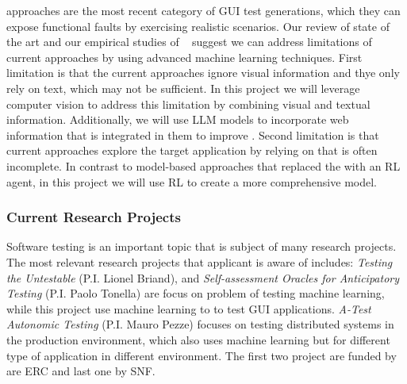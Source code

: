 
\smallskip 
\testreuse approaches are the most recent category of GUI test generations, which they can expose functional faults by exercising realistic scenarios.
Our review of state of the art and our empirical studies of \testreuse~\cite{mariani:SemFinder:ISSTA:2021,khalili:DomainEmbedding:ICPC:2022} suggest  we can address limitations of current approaches by using advanced machine learning techniques.
First limitation is that the current \testreuse approaches ignore visual information and thye only rely on text, which may not be sufficient. 
In this project we will leverage computer vision to address this limitation by combining visual and textual information.
Additionally, we will use LLM models to incorporate web information that is integrated in them to improve \testreuse. 
Second limitation is that current approaches explore the target application by relying on \tam that is often incomplete.
In contrast to model-based approaches that replaced the \tam with an RL agent, in this project we will use RL to create a more comprehensive model.


\subsubsection{Current Research Projects}

Software testing is an important topic that is subject of many research projects.
The most relevant research projects that applicant is aware of includes:
\textit{Testing the Untestable} (P.I. Lionel Briand), and
\textit{Self-assessment Oracles for Anticipatory Testing} (P.I. Paolo Tonella) are focus on problem of testing machine learning, while this project use machine learning to to test GUI applications.
\textit{A-Test Autonomic Testing} (P.I. Mauro Pezze) focuses on testing distributed systems in the production environment, which also uses machine learning but for different type of application in different environment. 
The first two project are funded by are ERC and last one by SNF.



